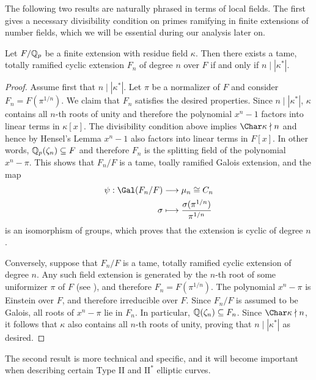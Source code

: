 The following two results are naturally phrased in terms of local fields. The first gives a necessary divisibility condition on primes ramifying in finite extensions of number fields, which we will be essential during our analysis later on.

\begin{prop}\label{prop_totally_ramified}
    Let $F/\mathbb{Q}_p$ be a finite extension with residue field $\kappa$. Then there exists a tame, totally ramified cyclic extension $F_n$ of degree $n$ over $F$ if and only if $n\mid|\kappa^*|$.
\end{prop}

\begin{proof}
    Assume first that $n\mid|\kappa^*|$. Let $\pi$ be a normalizer of $F$ and consider $F_n=F(\pi^{1/n})$. We claim that $F_n$ satisfies the desired properties. Since $n\mid|\kappa^*|$, $\kappa$ contains all $n$-th roots of unity and therefore the polynomial $x^n-1$ factors into linear terms in $\kappa[x]$. The divisibility condition above implies $\Char\kappa\nmid n$ and hence by Hensel's Lemma $x^n-1$ also factors into linear terms in $F[x]$. In other words, $\mathbb{Q}_p(\zeta_n)\subseteq F$ and therefore $F_n$ is the splitting field of the polynomial $x^n-\pi$. This shows that $F_n/F$ is a tame, toally ramified Galois extension, and the map 
    \begin{align*}
        \psi: \Gal(F_n/F)&\longrightarrow \mu_n\cong C_n\\
        \sigma &\longmapsto \frac{\sigma(\pi^{1/n})}{\pi^{1/n}}
    \end{align*}
    is an isomorphism of groups, which proves that the extension is cyclic of degree $n$.

    Conversely, suppose that $F_n/F$ is a tame, totally ramified cyclic extension of degree $n$. Any such field extension is generated by the $n$-th root of some uniformizer $\pi$ of $F$ (see \cite[Theorem 11.10]{Sun1}), and therefore $F_n=F(\pi^{1/n})$. The polynomial $x^n-\pi$ is Einstein over $F$, and therefore irreducible over $F$. Since $F_n/F$ is assumed to be Galois, all roots of $x^n-\pi$ lie in $F_n$. In particular, $\mathbb{Q}(\zeta_n)\subseteq F_n$. Since $\Char\kappa\nmid n$, it follows that $\kappa$ also contains all $n$-th roots of unity, proving that $n\mid|\kappa^*|$ as desired. 
\end{proof}

The second result is more technical and specific, and it will become important when describing certain Type II and $\mathrm{II}^*$ elliptic curves. 

